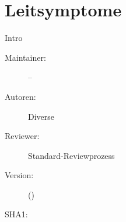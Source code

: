 \chapter
[\CO{[SYM]} Leitsymptome]
{\CC{[SYM]} Leitsymptome}

\ChapterIntro
{%
Intro 

}
{%
\begin{description}
  \item[Maintainer:] --
  \item[Autoren:] Diverse
  \item[Reviewer:] Standard-Reviewprozess
  \item[Version:] {\DocVersion} ({\DocVersionInfo})
  \item[SHA1:] {\DocGitCommit}
\end{description}

{\TxTeilkapitelAASS}
}

\SectionUnderDevelopment{}










